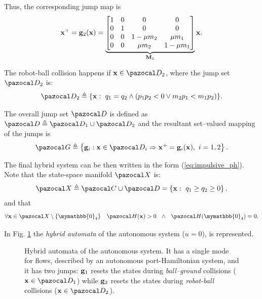 Thus, the corresponding jump map is
%
\begin{equation}
\mathbf{x}^+ = {\mathbf{g}}_2(\mathbf{x}) = 
\underbrace{
\begin{bmatrix}
	1 & 0 & 0 & 0\\
	0 & 1 & 0 & 0\\
	0 & 0 & 1 - \mu m_2 & \mu m_1\\
	0 & 0 & \mu m_2 & 1 - \mu m_1\\ 
	\end{bmatrix}}_{\mathbf{M}_1}\mathbf{x}.
\end{equation}
%

The robot-ball collision happens if $\xb\in\D_2$, where the jump set $\D_2$ is:
%
\begin{align}
    \D_2 \triangleq \{\xb:~q_1 = q_2\land (p_1p_2<0\lor m_2p_1< m_1p_2)\}.
\end{align}
%

The overall jump set $\D$ is defined as
%
$\D \triangleq \D_1\cup\D_2$
%
and the resultant set--valued  mapping of the jumps is
%
\begin{equation}
    \G\triangleq \left\{{\gb}_i:\xb\in\D_i\Rightarrow \xb^+ = \gb_i(\xb),~ i = 1,2\right\}.
\end{equation}
%

The final hybrid system can be then written in the form (\ref{eq:impulsive_ph}).
%
Note that the state-space manifold $\X$ is:
\begin{equation}
    \X \triangleq \C\cup\D = \left\{\xb:~q_1\geq q_2\geq 0\right\}.
\end{equation}
%
and that
%
\begin{align}
    \forall \xb\in\X\setminus\{\mymathbb{0}_4\}~~~\Ha(\xb)>0~~\land~~\Ha(\mymathbb{0}_4)=0.
\end{align}

In Fig. \ref{fig:uHPH} the \textit{hybrid automata} of the autonomous system ($u = 0$), is represented.
%
\begin{figure}[!ht]
	\centering
	
	\caption[Hybrid automata of the autonomous system]{Hybrid automata of the autonomous system. It has a single mode for flows, described by an autonomous port-Hamiltonian system, and it has two jumps: $\mathbf{g}_1$ resets the states during  \textit{ball--ground} collisions ($\xb\in\D_1$) while $\mathbf{g}_2$ resets the states during  \textit{robot-ball} collisions ($\xb\in\D_2$).}
	\label{fig:uHPH}
\end{figure}
\newpage

